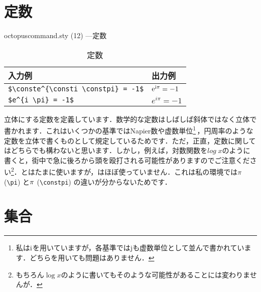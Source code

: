 \documentclass[uplatex]{jsreport}
\begin{document}
\section{定数}
\begin{insertcode}[firstnumber=167]{octopuscommand.sty (12) ---定数}
\newcommand{\conste}{\mathrm{e}}
\newcommand{\consti}{\mathrm{i}}
\newcommand{\constpi}{\mathrm{\pi}}
\end{insertcode}
\begin{table}[htbp]
  \centering
  \caption{定数}
  \label{table:2.const}
  \begin{tabular}{ll}\hline
    入力例 & 出力例 \\ \hline
    \verb|$\conste^{\consti \constpi} = -1$| & $\conste^{\consti \constpi} = -1$\\
    \verb|$e^{i \pi} = -1$| & $e^{i \pi} = -1$ \\\hline
  \end{tabular}
\end{table}\par
立体にする定数を定義しています．数学的な定数はしばしば斜体ではなく立体で書かれます．これはいくつかの基準ではNapier数や虚数単位\footnote{私は$\consti$を用いていますが，各基準では$\mathrm{j}$も虚数単位として並んで書かれています．どちらを用いても問題はありません．}\,，円周率のような定数を立体で書くものとして規定しているためです\cite{ISO80000-2,JISZ8201,nihonbutsuri}．ただ，正直，定数に関してはどちらでも構わないと思います．しかし，例えば，対数関数を$log\;x$のように書くと，街中で急に後ろから頭を殴打される可能性がありますのでご注意ください\footnote{もちろん$\log x$のように書いてもそのような可能性があることには変わりませんが．}．とはたまに使いますが，はほぼ使っていません．これは私の環境では$\pi$ (\verb|\pi|) と$\constpi$ (\verb|\constpi|) の違いが分からないためです．
\par
\section{集合}\label{section:set}
\end{document}
